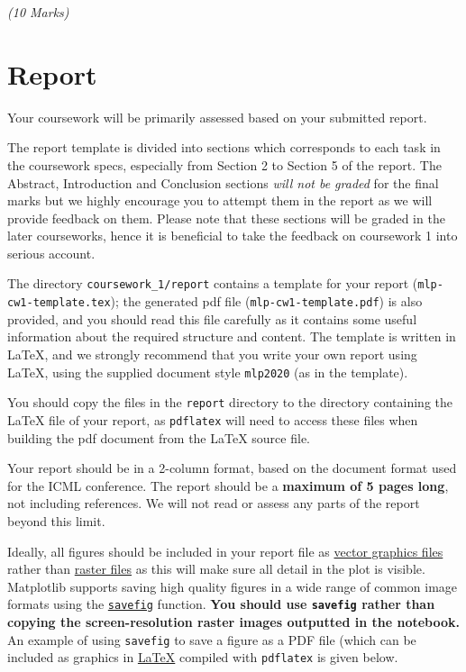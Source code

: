 \documentclass[11pt,]{article}
\begin{document}
\emph{(10 Marks)}

\section{Report}
\label{sec:report}
Your coursework will be primarily assessed based on your submitted report. 

The report template is divided into sections which corresponds to each task in the coursework specs, especially from Section 2 to Section 5 of the report. The Abstract, Introduction and Conclusion sections \textit{will not be graded} for the final marks but we highly encourage you to attempt them in the report as we will provide feedback on them. Please note that these sections will be graded in the later courseworks, hence it is beneficial to take the feedback on coursework 1 into serious account.


The directory \verb+coursework_1/report+ contains a template for your report (\verb+mlp-cw1-template.tex+);  the generated pdf file (\verb+mlp-cw1-template.pdf+) is also provided, and you should read this file carefully as it contains some useful information about the required structure and content. The template is written in LaTeX, and we strongly recommend that you write your own report using LaTeX, using the supplied document style \verb+mlp2020+ (as in the template).

You should copy the files in the \verb+report+ directory to the directory containing the LaTeX file of your report, as \verb+pdflatex+ will need to access these files when building the pdf document from the LaTeX source file.

Your report should be in a 2-column format, based on the document format used for the ICML conference. The report should be a \textbf{maximum of 5 pages long}, not including references.  We will not read or assess any parts of the report beyond this limit.



Ideally, all figures should be included in your report file as
\href{https://en.wikipedia.org/wiki/Vector_graphics}{vector graphics files}
rather than \href{https://en.wikipedia.org/wiki/Raster_graphics}{raster
files} as this will make sure all detail in the plot is visible.
Matplotlib supports saving high quality figures in a wide range of
common image formats using the
\href{http://matplotlib.org/api/pyplot_api.html\#matplotlib.pyplot.savefig}{\texttt{savefig}}
function. \textbf{You should use \texttt{savefig} rather than copying
the screen-resolution raster images outputted in the notebook.} An
example of using \texttt{savefig} to save a figure as a PDF file (which
can be included as graphics in
\href{https://en.wikibooks.org/wiki/LaTeX/Importing_Graphics}{LaTeX}
compiled with \texttt{pdflatex} 
is given below.
\end{document}
